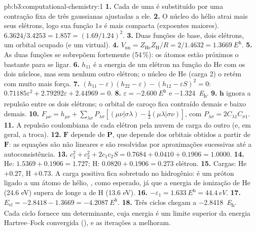 \begin{solution}{pb:b3:computational-chemistry:1}
\textbf{1.} Cada  de uma  é substituído por uma
contração fixa de três gaussianas ajustadas a ele.
\textbf{2.} O núcleo do hélio atrai mais seus elétrons, logo sua função $1s$
é mais compacta (expoentes maiores). $6.3624/3.4253 = 1.857 = (1.69/1.24)^2$.
\textbf{3.} Duas funções de base, dois elétrons, um orbital ocupado (e um
virtual).
\textbf{4.} $V_{\mathrm{nn}} = Z_{\mathrm{He}}Z_{\mathrm H}/R = 2/1.4632 =
\qty{1.3669}{\hartree}$.
\textbf{5.} As duas funções se sobrepõem fortemente (54\,\%): os átomos estão
próximos o bastante para se ligar.
\textbf{6.} $h_{11}$ é a energia de um elétron na função do He com os dois
núcleos, mas sem nenhum outro elétron; o núcleo de He (carga 2) o retém com
muito mais força.
\textbf{7.} $(h_{11} - \varepsilon)(h_{22} - \varepsilon) - (h_{12} - \varepsilon S)^2 = 0$:
$0.71185\varepsilon^2 + 2.79292\varepsilon + 2.44969 = 0$.
\textbf{8.} $\varepsilon = \qty{-2.600}{\hartree}$ e \qty{-1.324}{\hartree}.
\textbf{9.} $\mathbf h$ ignora a repulsão entre os dois elétrons; o orbital de
caroço fica contraído demais e baixo demais.
\textbf{10.} $F_{\mu\nu} = h_{\mu\nu} + \sum_{\lambda\sigma}P_{\lambda\sigma}[(\mu\nu|\sigma\lambda) -
\frac12(\mu\lambda|\sigma\nu)]$, com $P_{\lambda\sigma} = 2C_{\lambda1}C_{\sigma1}$.
\textbf{11.} A repulsão coulombiana de cada elétron pela nuvem de carga do
outro (e, em geral, a troca).
\textbf{12.} $\mathbf F$ depende de $\mathbf P$, que depende dos orbitais obtidos
a partir de $\mathbf F$: as equações são não lineares e são resolvidas por
aproximações sucessivas até a autoconsistência.
\textbf{13.} $c_1^2 + c_2^2 + 2c_1c_2S = 0.7684 + 0.0410 + 0.1906 = 1.0000$.
\textbf{14.} He: $1.5369 + 0.1906 = 1.727$; H: $0.0820 + 0.1906 = 0.273$
elétron.
\textbf{15.} Cargas: He $+0.27$, H $+0.73$. A carga positiva fica sobretudo no
hidrogênio:  é um próton ligado a um átomo de hélio, , como
esperado, já que a energia de ionização de He (24.6 eV) supera de longe a de H (13.6 eV).
\textbf{16.} $-\varepsilon_1 = \qty{1.633}{\hartree} = \qty{44.4}{eV}$.
\textbf{17.} $E_{\mathrm{el}} = -2.8418 - 1.3669 = \qty{-4.2087}{\hartree}$.
\textbf{18.} Três ciclos chegam a \qty{-2.8418}{\hartree}. Cada ciclo fornece um
determinante, cuja energia é um limite superior da energia Hartree--Fock
convergida (), e as iterações a melhoram.

\end{solution}

